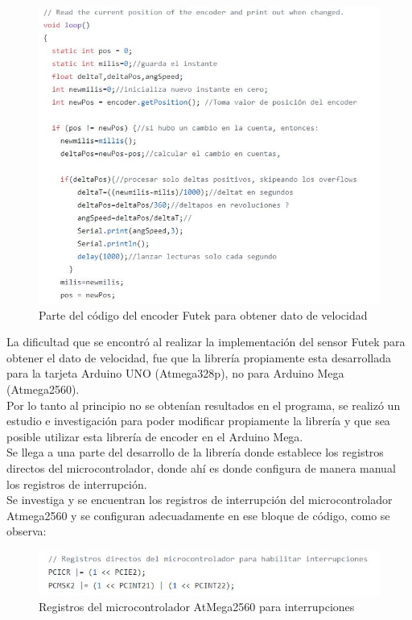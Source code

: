 \documentclass[12pt,titlepage]{article}
\begin{document}
\begin{figure}[htbp]
\hspace*{1.9cm} 
\includegraphics[scale=0.70]{code_encoder}
\caption{Parte del código del encoder Futek para obtener dato de velocidad}
\end{figure}
\newpage
La dificultad que se encontró al realizar la implementación del sensor Futek para obtener el dato de velocidad, fue que la librería propiamente esta desarrollada para la tarjeta Arduino UNO (Atmega328p), no para Arduino Mega (Atmega2560). \\

Por lo tanto al principio no se obtenían resultados en el programa, se realizó un estudio e investigación para poder modificar propiamente la librería y que sea posible utilizar esta librería de encoder en el Arduino Mega.\\

Se llega a una parte del desarrollo de la librería donde establece los registros directos del microcontrolador, donde ahí es donde configura de manera manual los registros de interrupción. \\

Se investiga y se encuentran los registros de interrupción del microcontrolador Atmega2560 y se configuran adecuadamente en ese bloque de código, como se observa: \\  

\begin{figure}[htbp]
\hspace*{1.9cm} 
\includegraphics[scale=0.85]{pines_int}
\caption{Registros del microcontrolador AtMega2560 para interrupciones}
\end{figure}
\end{document}

